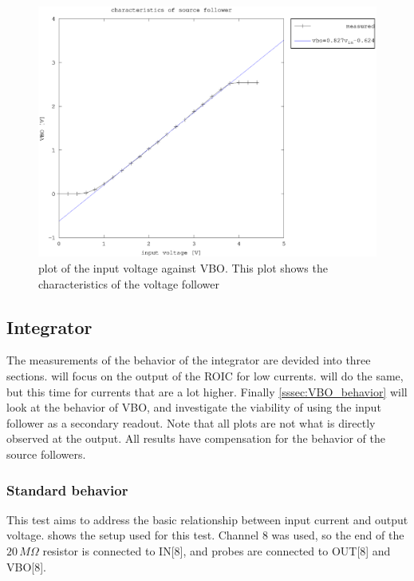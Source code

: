 \begin{figure}[h]
        \centering
            \includegraphics[width=\textwidth]{fig/source_follower.eps}
            \caption[]
                {plot of the input voltage against VBO. This plot shows the characteristics of the voltage follower}    
                \label{fig:source_follower}
        \end{figure}


\subsection{Integrator}\label{ssec:dynamic_integrator}
The measurements of the behavior of the integrator are devided into three sections.  will focus on the output of the ROIC for low currents.  will do the same, but this time for currents that are a lot higher. Finally \cref{sssec:VBO_behavior} will look at the behavior of VBO, and investigate the viability of using the input follower as a secondary readout. Note that all plots are not what is directly observed at the output. All results have compensation for the behavior of the source followers.

\subsubsection{Standard behavior}\label{sssec:standard_behavior}
This test aims to address the basic relationship between input current and output voltage.  shows the setup used for this test. Channel 8 was used, so the end of the $20\,M\Omega$ resistor is connected to IN[8], and probes are connected to OUT[8] and VBO[8]. 

